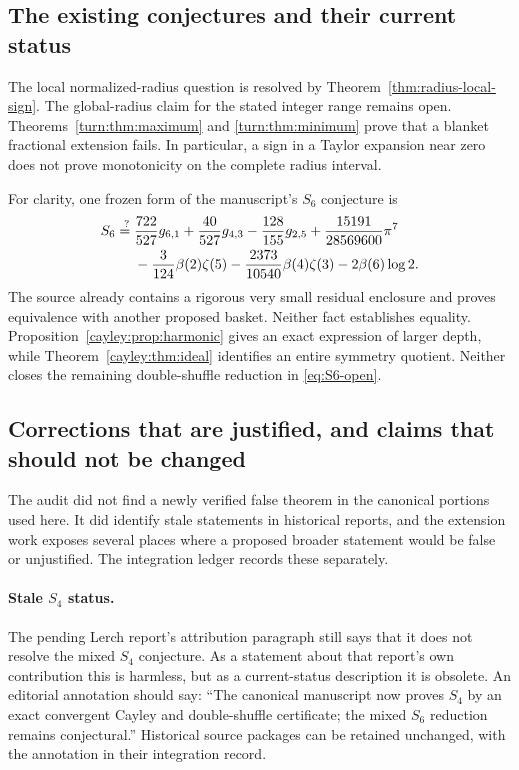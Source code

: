 \subsection{The existing conjectures and their current status}
The local normalized-radius question is resolved by
Theorem~\ref{thm:radius-local-sign}. The global-radius claim for the stated integer range remains
open. Theorems~\ref{turn:thm:maximum} and \ref{turn:thm:minimum}
prove that a blanket fractional extension fails. In particular, a sign in a Taylor expansion near zero does not
prove monotonicity on the complete radius interval.

For clarity, one frozen form of the manuscript's $S_6$ conjecture is
\begin{align}\label{eq:S6-open}
 S_6\stackrel{?}{={}}&
 \frac{722}{527}g_{6,1}+\frac{40}{527}g_{4,3}
 -\frac{128}{155}g_{2,5}
 +\frac{15191}{28569600}\pi^7\notag\\
 &-\frac3{124}\beta(2)\zeta(5)
 -\frac{2373}{10540}\beta(4)\zeta(3)
 -2\beta(6)\log2.
\end{align}
The source already contains a rigorous very small residual enclosure
and proves equivalence with another proposed basket. Neither fact
establishes equality. Proposition~\ref{cayley:prop:harmonic} gives an
exact expression of larger depth, while Theorem~\ref{cayley:thm:ideal}
identifies an entire symmetry quotient. Neither closes the remaining
double-shuffle reduction in \eqref{eq:S6-open}.

\subsection{Corrections that are justified, and claims that should not be changed}
The audit did not find a newly verified false theorem in the canonical
portions used here. It did identify stale statements in historical
reports, and the extension work exposes several places where a proposed
broader statement would be false or unjustified. The integration ledger
records these separately.

\paragraph{Stale $S_4$ status.}
The pending Lerch report's attribution paragraph still says that it does
not resolve the mixed $S_4$ conjecture. As a statement about that report's
own contribution this is harmless, but as a current-status description
it is obsolete. An editorial annotation should say: ``The canonical
manuscript now proves $S_4$ by an exact convergent Cayley and
double-shuffle certificate; the mixed $S_6$ reduction remains
conjectural.'' Historical source packages can be retained unchanged,
with the annotation in their integration record.

